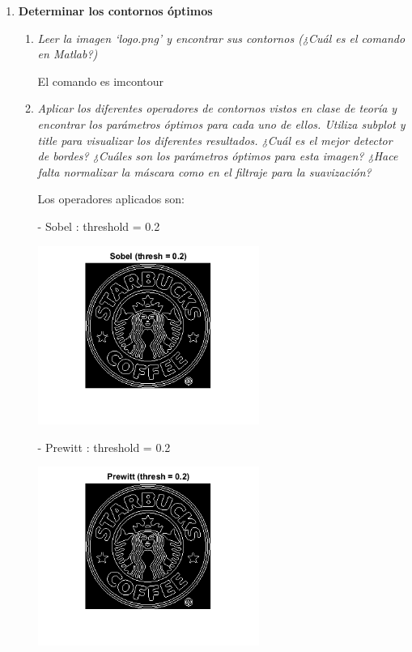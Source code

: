 \documentclass{article}
\begin{document}
\begin{enumerate}
\begin{enumerate}
 \end{enumerate}

\newpage

 \item \textbf{Determinar los contornos óptimos }

 \begin{enumerate}
 \item \textit{Leer  la  imagen  ‘logo.png’ y  encontrar  sus  contornos (¿Cuál  es  el  comando  en 
Matlab?)}

 El comando es imcontour

 \item \textit{Aplicar  los  diferentes  operadores  de  contornos  vistos  en  clase  de  teoría  y 
encontrar los parámetros óptimos para cada uno de ellos. Utiliza subplot y title para visualizar los diferentes resultados. ¿Cuál es el mejor detector de bordes? ¿Cuáles son los parámetros óptimos para esta  imagen? ¿Hace  falta  normalizar  la  máscara  como en el filtraje para la suavización?}

 Los operadores aplicados son:
 
 - Sobel : threshold = 0.2
 
 \begin{center}
 \includegraphics[width=0.6\textwidth]{3a(sobel).png}
 \end{center}
 
 - Prewitt : threshold = 0.2
 
 \begin{center}
 \includegraphics[width=0.6\textwidth]{3a(prewitt).png}
 \end{center} 
 

\end{enumerate}
\end{enumerate}
\end{document}
